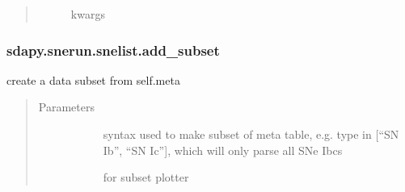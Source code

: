 \documentclass[letterpaper,10pt,english]{sphinxmanual}
\begin{document}
\begin{fulllineitems}
\begin{fulllineitems}
\begin{quote}
\begin{description}
\begin{description}
\item[{}] \leavevmode{[}\sphinxtitleref{Keyword Arguments}{]}
 kwargs

\end{description}

\end{description}\end{quote}

\end{fulllineitems}



\subsubsection{sdapy.snerun.snelist.add\_subset}
\label{\detokenize{generated/sdapy.snerun.snelist.add_subset:sdapy-snerun-snelist-add-subset}}\label{\detokenize{generated/sdapy.snerun.snelist.add_subset::doc}}

\begin{fulllineitems}
\label{\detokenize{generated/sdapy.snerun.snelist.add_subset:sdapy.snerun.snelist.add_subset}}
create a data subset from self.meta
\begin{quote}\begin{description}
\item[{Parameters}] \leavevmode\begin{description}
\item[{}] \leavevmode{[}\sphinxtitleref{str}{]}
syntax used to make subset of meta table, e.g.
type in {[}“SN Ib”, “SN Ic”{]}, which will only parse all SNe Ibcs

\item[{}] \leavevmode{[}\sphinxtitleref{Keyword Arguments}{]}
for subset plotter

\end{description}

\end{description}\end{quote}

\end{fulllineitems}




\end{fulllineitems}
\end{document}
